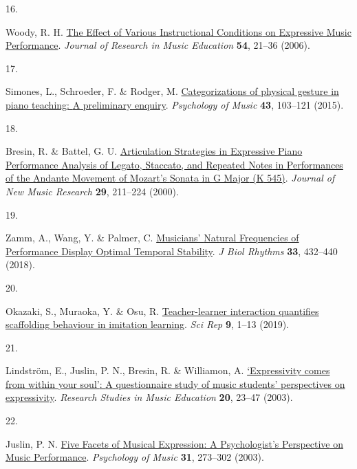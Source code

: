 \documentclass[
  man,floatsintext]{apa6}
\newlength{\cslhangindent}
\newlength{\csllabelwidth}
\newlength{\cslentryspacingunit} %
\newenvironment{CSLReferences}[2] %
 {%
  \setlength{\parindent}{0pt}
  \ifodd #1
  \let\oldpar\par
  \def\par{\hangindent=\cslhangindent\oldpar}
  \fi
  \setlength{\parskip}{#2\cslentryspacingunit}
 }%
 {}
\newcommand{\CSLLeftMargin}[1]{\parbox[t]{\csllabelwidth}{#1}}
\newcommand{\CSLRightInline}[1]{\parbox[t]{\linewidth - \csllabelwidth}{#1}\break}
\begin{document}
\begin{CSLReferences}{0}{0}
\leavevmode{}%
\CSLLeftMargin{16. }%
\CSLRightInline{Woody, R. H. \href{https://doi.org/10.1177/002242940605400103}{The {Effect} of {Various Instructional Conditions} on {Expressive Music Performance}}. \emph{Journal of Research in Music Education} \textbf{54}, 21--36 (2006).}

\leavevmode{}%
\CSLLeftMargin{17. }%
\CSLRightInline{Simones, L., Schroeder, F. \& Rodger, M. \href{https://doi.org/10.1177/0305735613498918}{Categorizations of physical gesture in piano teaching: {A} preliminary enquiry}. \emph{Psychology of Music} \textbf{43}, 103--121 (2015).}

\leavevmode{}%
\CSLLeftMargin{18. }%
\CSLRightInline{Bresin, R. \& Battel, G. U. \href{https://doi.org/10.1076/jnmr.29.3.211.3092}{Articulation {Strategies} in {Expressive Piano Performance Analysis} of {Legato}, {Staccato}, and {Repeated Notes} in {Performances} of the {Andante Movement} of {Mozart}'s {Sonata} in {G Major} ({K} 545)}. \emph{Journal of New Music Research} \textbf{29}, 211--224 (2000).}

\leavevmode{}%
\CSLLeftMargin{19. }%
\CSLRightInline{Zamm, A., Wang, Y. \& Palmer, C. \href{https://doi.org/10.1177/0748730418783651}{Musicians' {Natural Frequencies} of {Performance Display Optimal Temporal Stability}}. \emph{J Biol Rhythms} \textbf{33}, 432--440 (2018).}

\leavevmode{}%
\CSLLeftMargin{20. }%
\CSLRightInline{Okazaki, S., Muraoka, Y. \& Osu, R. \href{https://doi.org/10.1038/s41598-019-44049-x}{Teacher-learner interaction quantifies scaffolding behaviour in imitation learning}. \emph{Sci Rep} \textbf{9}, 1--13 (2019).}

\leavevmode{}%
\CSLLeftMargin{21. }%
\CSLRightInline{Lindström, E., Juslin, P. N., Bresin, R. \& Williamon, A. \href{https://doi.org/10.1177/1321103X030200010201}{{`{Expressivity} comes from within your soul'}: {A} questionnaire study of music students' perspectives on expressivity}. \emph{Research Studies in Music Education} \textbf{20}, 23--47 (2003).}

\leavevmode{}%
\CSLLeftMargin{22. }%
\CSLRightInline{Juslin, P. N. \href{https://doi.org/10.1177/03057356030313003}{Five {Facets} of {Musical Expression}: {A Psychologist}'s {Perspective} on {Music Performance}}. \emph{Psychology of Music} \textbf{31}, 273--302 (2003).}


\end{CSLReferences}
\end{document}
